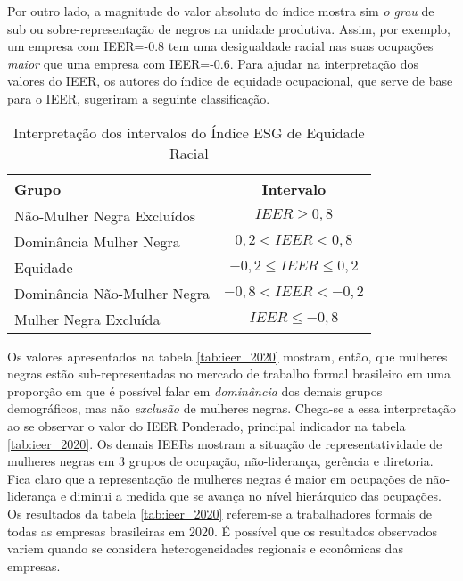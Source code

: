 \documentclass[12pt]{article}
\begin{document}
\par Por outro lado, a magnitude do valor absoluto do índice mostra sim \textit{o grau} de sub ou sobre-representação de negros na unidade produtiva. Assim, por exemplo, um empresa com IEER=-0.8 tem uma desigualdade racial nas suas ocupações \textit{maior} que uma empresa com IEER=-0.6. Para ajudar na interpretação dos valores do IEER, os autores do índice de equidade ocupacional, que serve de base para o IEER, sugeriram a seguinte classificação.\autocite{ransom2001one}

\begin{table}[htb!]
\centering
\caption{Interpretação dos intervalos do Índice ESG de Equidade Racial}
\begin{tabular}{lc}
\hline
Grupo             & Intervalo                 \\ \hline
Não-Mulher Negra Excluídos & $IEER \geq 0, 8 $               \\
Dominância Mulher Negra  & $0,2 < IEER < 0,8$   \\
Equidade          & $-0,2\leq IEER \leq 0,2$  \\
Dominância Não-Mulher Negra & $-0,8 < IEER < -0,2$ \\
Mulher Negra Excluída  & $IEER \leq -0,8$        \\ \hline
\end{tabular}
\end{table}

\par Os valores apresentados na tabela \ref{tab:ieer_2020} mostram, então, que mulheres negras estão sub-representadas no mercado de trabalho formal brasileiro em uma proporção em que é possível falar em \textit{dominância} dos demais grupos demográficos, mas não \textit{exclusão} de mulheres negras. Chega-se a essa interpretação ao se observar o valor do IEER Ponderado, principal indicador na tabela \ref{tab:ieer_2020}. Os demais IEERs mostram a situação de representatividade de mulheres negras em 3 grupos de ocupação, não-liderança, gerência e diretoria. Fica claro que a representação de mulheres negras é maior em ocupações de não-liderança e diminui a medida que se avança no nível hierárquico das ocupações. Os resultados da tabela \ref{tab:ieer_2020} referem-se a trabalhadores formais de todas as empresas brasileiras em 2020. É possível que os resultados observados variem quando se considera heterogeneidades regionais e econômicas das empresas.


\end{document}
